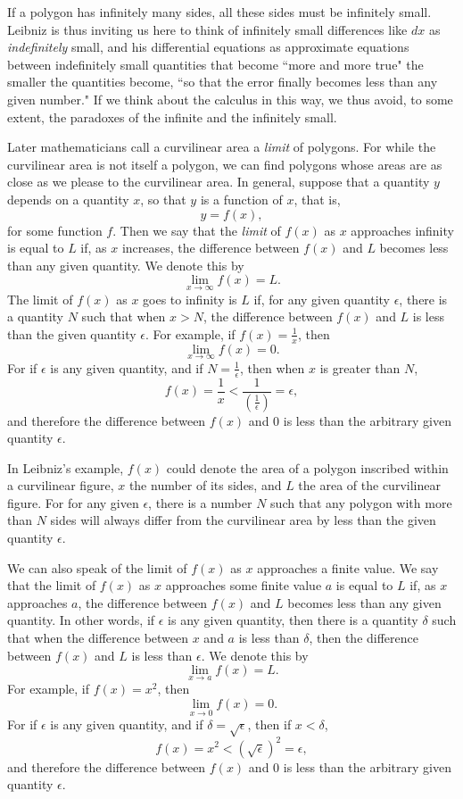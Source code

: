 \documentclass[twoside,openright]{article}
\begin{document}
If a polygon has infinitely many sides, all these sides must be
infinitely small.  Leibniz is thus inviting us here to think of
infinitely small differences like $dx$ as {\em indefinitely} small,
and his differential equations as approximate equations between
indefinitely small quantities that become ``more and more true" the
smaller the quantities become, ``so that the error finally becomes
less than any given number."  If we think about the calculus in this
way, we thus avoid, to some extent, the paradoxes of the infinite and
the infinitely small.

Later mathematicians call a curvilinear area a {\em limit} of
polygons. For while the curvilinear area is not itself a polygon, we
can find polygons whose areas are as close as we please to the
curvilinear area.  In general, suppose that a quantity $y$ depends on
a quantity $x$, so that $y$ is a function of $x$, that is,
$$y = f(x),$$
for some function $f$.  Then we say that the {\em limit} of $f(x)$ as
$x$ approaches infinity is equal to $L$ if, as $x$ increases, the
difference between $f(x)$ and $L$ becomes less than any given
quantity. We denote this by
$$\lim_{x\rightarrow \infty}f(x) = L.$$
The limit of $f(x)$ as $x$ goes to infinity is $L$ if, for any given
quantity $\epsilon$, there is a quantity $N$ such that when $x>N$, the
difference between $f(x)$ and $L$ is less than the given quantity
$\epsilon$.  For example, if $\displaystyle f(x) = \frac{1}{x}$, then
$$\lim_{x\rightarrow \infty}f(x) = 0.$$
For if $\epsilon$ is any given quantity, and if
$\displaystyle N =\frac{1}{\epsilon}$, then when $x$ is greater than
$N$,
$$f(x)= \frac{1}{x} < \frac{1}{\left(\frac{1}{\epsilon}\right)}= \epsilon,$$
and therefore the difference between $f(x)$ and $0$ is less than the
arbitrary given quantity $\epsilon$.

In Leibniz's example, $f(x)$ could denote the area of a polygon
inscribed within a curvilinear figure, $x$ the number of its sides,
and $L$ the area of the curvilinear figure.  For for any given
$\epsilon$, there is a number $N$ such that any polygon with more than
$N$ sides will always differ from the curvilinear area by less than
the given quantity $\epsilon$.

We can also speak of the limit of $f(x)$ as $x$ approaches a finite
value.  We say that the limit of $f(x)$ as $x$ approaches some finite
value $a$ is equal to $L$ if, as $x$ approaches $a$, the difference
between $f(x)$ and $L$ becomes less than any given quantity.  In other
words, if $\epsilon$ is any given quantity, then there is a quantity
$\delta$ such that when the difference between $x$ and $a$ is less
than $\delta$, then the difference between $f(x)$ and $L$ is less than
$\epsilon$.  We denote this by
$$\lim_{x\rightarrow a}f(x) = L.$$
For example, if $f(x) = x^2$, then 
$$\lim_{x\rightarrow 0}f(x) = 0.$$
For if $\epsilon$ is any given quantity, and if
$\delta = \sqrt{\epsilon}$, then if $x < \delta$,
$$f(x) = x^2 < (\sqrt{\epsilon})^2 = \epsilon,$$
and therefore the difference between $f(x)$ and $0$ is less than the
arbitrary given quantity $\epsilon$.
\end{document}
